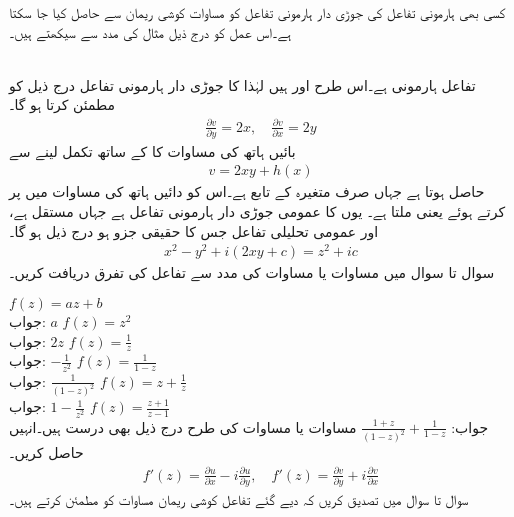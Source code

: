 کسی بھی ہارمونی تفاعل کی جوڑی دار ہارمونی تفاعل کو مساوات کوشی ریمان سے حاصل کیا جا سکتا ہے۔اس عمل کو درج ذیل مثال کی مدد سے سیکھتے ہیں۔

\quad {}\\
تفاعل  ہارمونی ہے۔اس طرح اور  ہیں لہٰذا  کا جوڑی دار ہارمونی تفاعل درج ذیل کو مطمئن کرتا ہو گا۔
\begin{align*}
\frac{\partial v}{\partial y}=2x,\quad \frac{\partial v}{\partial x}=2y
\end{align*}
بائیں ہاتھ کی مساوات کا  کے ساتھ تکمل لینے سے 
\begin{align*}
v=2xy+h(x)
\end{align*}
حاصل ہوتا ہے جہاں  صرف متغیرہ  کے تابع ہے۔اس کو دائیں ہاتھ کی مساوات میں پر کرتے ہوئے  یعنی  ملتا ہے۔ یوں  کا عمومی جوڑی دار ہارمونی تفاعل  ہے جہاں  مستقل ہے، اور عمومی تحلیلی تفاعل جس کا حقیقی جزو  ہو درج ذیل ہو گا۔
\begin{align*}
x^2-y^2+i(2xy+c)=z^2+ic
\end{align*}
سوال  تا سوال  میں مساوات  یا مساوات  کی مدد سے تفاعل کی تفرق دریافت کریں۔

\quad
$f(z)=az+b$\\
جواب:\quad
$a$
\quad
$f(z)=z^2$\\
جواب:\quad
$2z$
\quad
$f(z)=\tfrac{1}{z}$\\
جواب:\quad
$-\tfrac{1}{z^2}$
\quad
$f(z)=\tfrac{1}{1-z}$\\
جواب:\quad
$\tfrac{1}{(1-z)^2}$
\quad
$f(z)=z+\tfrac{1}{z}$\\
جواب:\quad
$1-\tfrac{1}{z^2}$
\quad
$f(z)=\tfrac{z+1}{z-1}$\\
جواب:\quad
$\tfrac{1+z}{(1-z)^2}+\tfrac{1}{1-z}$
\quad
مساوات  یا مساوات  کی طرح درج ذیل بھی درست ہیں۔انہیں حاصل کریں۔
\begin{align}\label{مساوات_مخلوط_کوشی_ریمان_ثبوت_ٹ}
f'(z)=\frac{\partial u}{\partial x}-i\frac{\partial u}{\partial y},\quad f'(z)=\frac{\partial v}{\partial y}+i\frac{\partial v}{\partial x}
\end{align}
سوال  تا سوال  میں تصدیق کریں کہ دیے گئے تفاعل کوشی ریمان مساوات کو مطمئن کرتے ہیں۔

